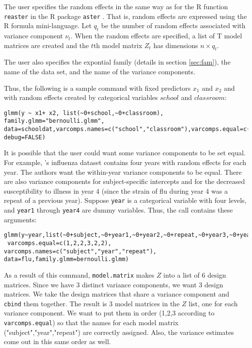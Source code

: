 \documentclass{article}
\newcommand{\pcite}[1]{\citeauthor{#1}'s \citeyearpar{#1}}
\begin{document}
The user  specifies the random effects in the same way as for the R function \texttt{reaster} in the R package
 \texttt{aster} \citep{aster-package}. That is, random effects are expressed using the R formula mini-language. Let $q_t$ be the number of random effects associated with variance component $\nu_t$. When the random effects are specified, a list of T model matrices are created and the $t$th model matrix $Z_t$ has dimensions $n \times q_t$.


The user also specifies the expontial family (details in section \ref{sec:fam}), the name of the data set, and the name of the variance components.  

Thus, the following is a sample command with fixed predictors $x_1$ and $x_2$ and with random effects created by categorical variables $school$ and $classroom$:
\begin{verbatim}
glmm(y ~ x1+ x2, list(~0+school,~0+classroom),  family.glmm="bernoulli.glmm", 
data=schooldat,varcomps.names=c("school","classroom"),varcomps.equal=c(1,2),
debug=FALSE)
 \end{verbatim} 



It is possible that the user could want some variance components to be set equal. For example, \pcite{coull:agresti:2000} influenza dataset contains four years with random effects for each year. The authors want the within-year variance components to be equal.  There are also variance components for subject-specific intercepts and for the decreased susceptibility to illness in year 4 (since the strain of flu during year 4 was a repeat of a previous year). Suppose \texttt{year} is a categorical variable with four levels, and \texttt{year1} through \texttt{year4} are dummy variables. Thus, the call  contains these arguments:
\begin{verbatim}
glmm(y~year,list(~0+subject,~0+year1,~0+year2,~0+repeat,~0+year3,~0+year4),
 varcomps.equal=c(1,2,2,3,2,2), varcomps.names=c("subject","year","repeat"),
data=flu,family.glmm=bernoulli.glmm)
\end{verbatim}

As a result of this command, \texttt{model.matrix}  makes $Z$ into a list of 6 design matrices. Since we have 3 distinct variance components, we want 3 design matrices. We take the design matrices that share a variance component and \texttt{cbind} them together. The result is 3 model matrices in the $Z$ list, one for each variance component. We  want to put them in order (1,2,3 according to \texttt{varcomps.equal}) so that the names for each model matrix  ("subject","year","repeat") are correctly assigned.  Also, the variance estimates  come out in this same order as well.
    
\end{document}
